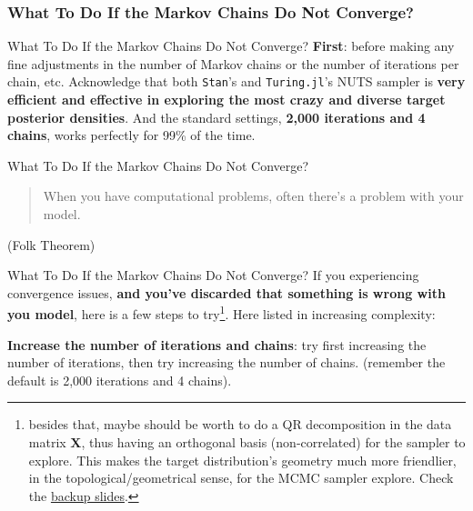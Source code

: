 \subsubsection{What To Do If the Markov Chains Do Not Converge?}
\begin{frame}{What To Do If the Markov Chains Do Not Converge?}
    \textbf{First}: before making any fine adjustments in the number of Markov chains
    or the number of iterations per chain, etc.
    Acknowledge that both \texttt{Stan}'s and \texttt{Turing.jl}'s NUTS sampler is
    \textbf{very efficient and effective in exploring the
        most crazy and diverse target posterior densities}.
    \vfill
    And the standard settings, \textbf{2,000 iterations and 4 chains},
    works perfectly for 99\% of the time.
\end{frame}

\begin{frame}{What To Do If the Markov Chains Do Not Converge?}
    \vfill
    \begin{quotation}
        When you have computational problems,
        often there’s a problem with your model.
    \end{quotation}
    \vfill \vfill
    \textcite{gelmanFolkTheoremStatistical2008} (Folk Theorem)
\end{frame}

\begin{frame}{What To Do If the Markov Chains Do Not Converge?}
    If you experiencing convergence issues,
    \textbf{and you've discarded that something is wrong with you model},
    here is a few steps to try\footnote{
        besides that,
        maybe should be worth to do a QR decomposition in the data matrix $\mathbf{X}$,
        thus having an orthogonal basis (non-correlated) for the sampler to explore.
        This makes the target distribution's geometry much more friendlier,
        in the topological/geometrical sense,
        for the MCMC sampler explore.
        Check the \hyperlink{appendixqr}{backup slides}.}.
    Here listed in increasing complexity:
    \begin{vfilleditems}
        \item[1.] \textbf{Increase the number of iterations and chains}:
        try first increasing the number of iterations,
        then try increasing the number of chains.
        (remember the default is 2,000 iterations and 4 chains).
    \end{vfilleditems}
\end{frame}


